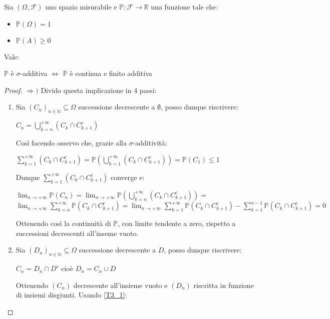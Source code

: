\begin{theorem}
   Sia $(\Omega,\mathscr{F})$ uno spazio misurabile e $\mathbb{P}:\mathscr{F}\longrightarrow\mathbb{R}$ una funzione tale che:
   \begin{itemize}
       \item $\mathbb{P}(\Omega)=1$
       \item $\mathbb{P}(A)\geq0$
   \end{itemize}
   Vale:
   \begin{center}
       $\mathbb{P}$ è $\sigma$-additiva $\iff$ $\mathbb{P}$ è continua e finito additiva
   \end{center}
   
\begin{proof}
$\Rightarrow)$ Divido questa implicazione in 4 passi:
\begin{enumerate}
\item Sia $(C_n)_{n\in\mathbb{N}}\subseteq\Omega$ successione decrescente a $\emptyset$, posso dunque riscrivere:
\begin{center}
    $C_n=\bigcup\limits_{k=n}^{+\infty}(C_k\cap C_{k+1}^c)$
\end{center}
Così facendo osservo che, grazie alla $\sigma$-additività:
\begin{center}
    $\sum\limits_{k=1}^{+\infty}(C_k\cap C_{k+1}^c)=\mathbb{P}(\bigcup\limits_{k=1}^{+\infty}(C_k\cap C_{k+1}^c))=\mathbb{P}(C_1)\leq1$
\end{center}
 Dunque $\sum\limits_{k=1}^{+\infty}(C_k\cap C_{k+1}^c)$ converge e:
\begin{center}
    $\lim_{n\to+\infty}\mathbb{P}(C_n)=\lim_{n\to+\infty}\mathbb{P}(\bigcup\limits_{k=n}^{+\infty}(C_k\cap C_{k+1}^c))=$
    \newline
    $\lim_{n\to+\infty}\sum\limits_{k=n}^{+\infty}\mathbb{P}(C_k\cap C_{k+1}^c)=\lim_{n\to+\infty}\sum\limits_{k=1}^{+\infty}\mathbb{P}(C_k\cap C_{k+1}^c)-\sum\limits_{k=1}^{n-1}\mathbb{P}(C_k\cap C_{k+1}^c)=0$
\end{center}
Ottenendo così la continuità di $\mathbb{P}$, con limite tendente a zero, rispetto a successioni decrescenti all'inseme vuoto.
\label{T3_1}
\item Sia $(D_n)_{n\in\mathbb{N}}\subseteq\Omega$ successione decrescente a $D$, posso dunque riscrivere:
\begin{center}
    $C_n=D_n\cap D^c$ cioè $D_n=C_n\cup D$
\end{center}
Ottenendo $(C_n)$ decrescente all'insieme vuoto e $(D_n)$ riscritta in funzione di insiemi disgiunti. Usando \ref{T3_1}:

\end{enumerate}
\end{proof}
\end{theorem}
